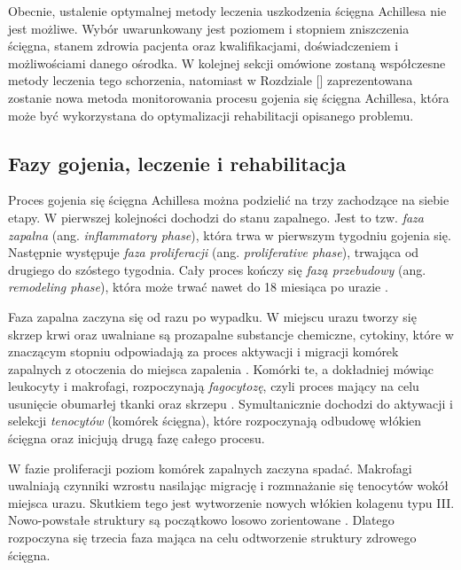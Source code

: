 Obecnie, ustalenie optymalnej metody leczenia uszkodzenia ścięgna Achillesa nie jest możliwe. Wybór uwarunkowany jest poziomem i stopniem zniszczenia ścięgna, stanem zdrowia pacjenta oraz kwalifikacjami, doświadczeniem i możliwościami danego ośrodka. W kolejnej sekcji omówione zostaną współczesne metody leczenia tego schorzenia, natomiast w Rozdziale [] zaprezentowana zostanie nowa metoda monitorowania procesu gojenia się ścięgna Achillesa, która może być wykorzystana do optymalizacji rehabilitacji opisanego problemu. 

\subsection{Fazy gojenia, leczenie i rehabilitacja}
\label{gojenie}

Proces gojenia się ścięgna Achillesa można podzielić na trzy zachodzące na siebie etapy. W pierwszej kolejności dochodzi do stanu zapalnego. Jest to tzw. \textit{faza zapalna} (ang. \textit{inflammatory phase}), która trwa w pierwszym tygodniu gojenia się. Następnie występuje \textit{faza proliferacji} (ang. \textit{proliferative phase}), trwająca od drugiego do szóstego tygodnia. Cały proces kończy się \textit{fazą przebudowy} (ang. \textit{remodeling phase}), która może trwać nawet do 18 miesiąca po urazie \cite{Sharma2006, Yang2013, Docheva2015, CMC}. 

Faza zapalna zaczyna się od razu po wypadku. W miejscu urazu tworzy się skrzep krwi oraz uwalniane są prozapalne substancje chemiczne, cytokiny, które w znaczącym stopniu odpowiadają za proces aktywacji i migracji komórek zapalnych z otoczenia do miejsca zapalenia \cite{Lin2004}. Komórki te, a dokładniej mówiąc leukocyty i makrofagi, rozpoczynają \textit{fagocytozę}, czyli proces mający na celu usunięcie obumarłej tkanki oraz skrzepu \cite{Yang2013, Beredjiklian2003, Lin2004}. Symultanicznie dochodzi do aktywacji i selekcji \textit{tenocytów} (komórek ścięgna), które rozpoczynają odbudowę włókien ścięgna \cite{Yang2013} oraz inicjują drugą fazę całego procesu.

W fazie proliferacji poziom komórek zapalnych zaczyna spadać. Makrofagi uwalniają czynniki wzrostu nasilając migrację i rozmnażanie się tenocytów wokół miejsca urazu. Skutkiem tego jest wytworzenie nowych włókien kolagenu typu III. Nowo-powstałe struktury są początkowo losowo zorientowane \cite{Yang2013, Beredjiklian2003, Docheva2015}. Dlatego rozpoczyna się trzecia faza mająca na celu odtworzenie struktury zdrowego ścięgna.

